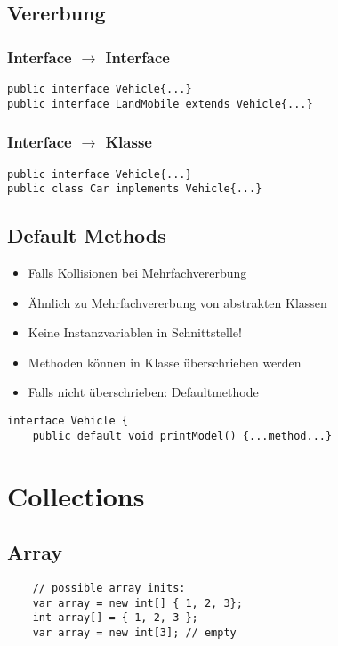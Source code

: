 \begin{multicols*}{5}
	\subsection{Vererbung}
		\subsubsection{Interface $\rightarrow$ Interface}
			\begin{lstlisting}
public interface Vehicle{...}
public interface LandMobile extends Vehicle{...}
			\end{lstlisting}
		\subsubsection{Interface $\rightarrow$ Klasse}
			\begin{lstlisting}
public interface Vehicle{...}
public class Car implements Vehicle{...}
			\end{lstlisting}
	
	
	\columnbreak
	
	
	\subsection{Default Methods}
	\begin{itemize}
		\item Falls Kollisionen bei Mehrfachvererbung 
		\item Ähnlich zu Mehrfachvererbung von abstrakten Klassen
		\item Keine Instanzvariablen in Schnittstelle!
		\item Methoden können in Klasse überschrieben werden
		\item Falls nicht überschrieben: Defaultmethode
	\end{itemize}
		\begin{lstlisting}
interface Vehicle {
	public default void printModel() {...method...}
		\end{lstlisting}





	\section{Collections}
	\subsection{Array}
		\begin{lstlisting}
	// possible array inits:
	var array = new int[] { 1, 2, 3};
	int array[] = { 1, 2, 3 };
	var array = new int[3]; // empty
	

\end{lstlisting}
\end{multicols*}
